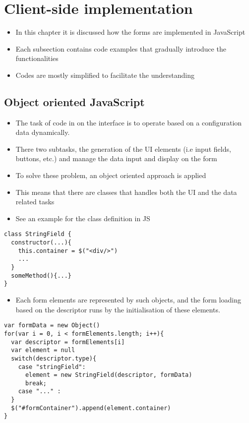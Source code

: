 \section{Client-side implementation}

\begin{itemize}
	\item In this chapter it is discussed how the forms are implemented in JavaScript
	\item Each subsection contains code examples that gradually introduce the functionalities
	\item Codes are mostly simplified to facilitate the understanding		
\end{itemize}


\subsection{Object oriented JavaScript}


\begin{itemize}
	\item The task of code in on the interface is to operate based on a configuration data dynamically.
	\item There two subtasks, the generation of the UI elements (i.e input fields, buttons, etc.) and manage the data input and display on the form
	\item To solve these problem, an object oriented approach is applied
	\item This means that there are classes that handles both the UI and the data related tasks
	\item See an example for the class definition in JS
\end{itemize}

	
\begin{lstlisting}[basicstyle=\footnotesize, frame=single, caption={JavaScript class}, captionpos=b]
class StringField {
  constructor(...){
    this.container = $("<div/>")
    ...
  }
  someMethod(){...}			
}
\end{lstlisting}
	
\begin{itemize}
	\item Each form elements are represented by such objects, and the form loading based on the descriptor runs by the initialisation of these elements.  
\end{itemize}

\begin{lstlisting}[basicstyle=\footnotesize, frame=single, caption={Form generation based on configuration data}, captionpos=b]
var formData = new Object()
for(var i = 0, i < formElements.length; i++){
  var descriptor = formElements[i]
  var element = null
  switch(descriptor.type){
    case "stringField":
      element = new StringField(descriptor, formData)
      break;
    case "..." : 
  }
  $("#formContainer").append(element.container)
}	
\end{lstlisting}


